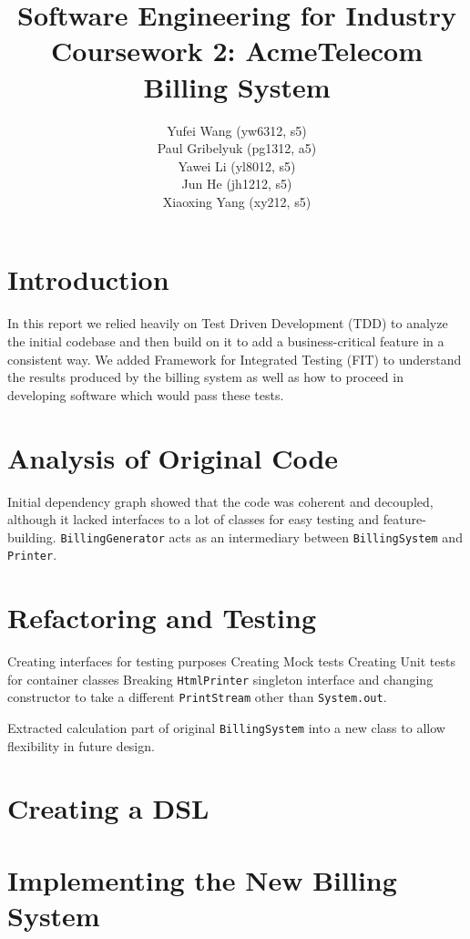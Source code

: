 \documentclass{article}
\author{
    Yufei Wang (yw6312, s5) \\ 
    Paul Gribelyuk (pg1312, a5) \\
    Yawei Li (yl8012, s5) \\ 
    Jun He (jh1212, s5) \\
    Xiaoxing Yang (xy212, s5)
}
\title{\Huge Software Engineering for Industry \\ Coursework 2: AcmeTelecom Billing System}
\begin{document}
\maketitle

\section{Introduction} %
In this report we relied heavily on Test Driven Development (TDD) to analyze the initial codebase and then build on it to add a business-critical feature in a consistent way.  We added Framework for Integrated Testing (FIT) to understand the results produced by the billing system as well as how to proceed in developing software which would pass these tests.

\section{Analysis of Original Code} %
Initial dependency graph showed that the code was coherent and decoupled, although it lacked interfaces to a lot of classes for easy testing and feature-building.  \verb+BillingGenerator+ acts as an intermediary between \verb+BillingSystem+ and \verb+Printer+.

\section{Refactoring and Testing} %
Creating interfaces for testing purposes
Creating Mock tests
Creating Unit tests for container classes
Breaking \verb+HtmlPrinter+ singleton interface and changing constructor to take a different \verb+PrintStream+ other than \verb+System.out+.

Extracted calculation part of original \verb+BillingSystem+ into a new class to allow flexibility in future design.

\section{Creating a DSL} %

\section{Implementing the New Billing System}  %
\end{document}
